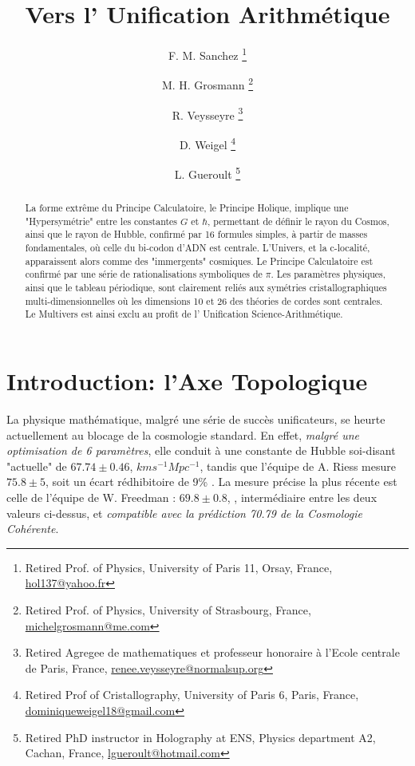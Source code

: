 \documentclass[a4paper,9pt]{article}
\title{Vers l' Unification Arithmétique}
\author{F. M. Sanchez \thanks{Retired Prof. of Physics, University of Paris 11, Orsay, France, \href{mailto:hol137@yahoo.fr}{hol137@yahoo.fr}} 
   \and M. H. Grosmann \thanks{Retired Prof. of Physics, University of Strasbourg, France, \href{mailto:michelgrosmann@me.com}{michelgrosmann@me.com}}
   \and R. Veysseyre \thanks{Retired Agregee de mathematiques et professeur honoraire \`a l'Ecole centrale de Paris, France, \href{mailto:renee.veysseyre@normalsup.org}{renee.veysseyre@normalsup.org}}
   \and D. Weigel  \thanks{Retired Prof of Cristallography, University of Paris 6, Paris, France, \href{mailto:dominiqueweigel18@gmail.com}{dominiqueweigel18@gmail.com}} 
   \and L. Gueroult \thanks{Retired PhD instructor in Holography at ENS, Physics department A2, Cachan, France, \href{mailto:lgueroult@hotmail.com}{lgueroult@hotmail.com}}
   }
\newcounter{row}
\begin{document}
\setcounter{page}{1}

\maketitle

\begin{abstract}


La forme extrême du Principe Calculatoire, le Principe Holique, implique une "Hypersymétrie" entre les constantes $G$ et $\hbar$, permettant de définir le rayon du Cosmos, ainsi que le rayon de Hubble, confirmé par 16 formules simples, à partir de masses fondamentales, où celle du bi-codon d'ADN est centrale. L'Univers, et la c-localité, apparaissent alors comme des "immergents" cosmiques. Le Principe Calculatoire est confirmé par une série de rationalisations symboliques de $\pi$. 
Les paramètres physiques, ainsi que le tableau périodique, sont clairement reliés aux symétries cristallographiques multi-dimensionnelles où les dimensions 10 et 26 des théories de cordes sont centrales.
Le Multivers est ainsi exclu au profit de l' Unification Science-Arithmétique. 


\end{abstract}






\tableofcontents
\listoftables{}   %
\listoffigures{}  %
\pagebreak

\section{Introduction: l'Axe Topologique}\label{AxeTopologique}

La physique mathématique, malgré une série de succès unificateurs, se heurte actuellement au blocage de la cosmologie standard. En effet, \textit{malgré une optimisation de 6 paramètres}, elle conduit à une constante de Hubble soi-disant "actuelle" de $67.74 \pm 0.46$, $km s^{-1}Mpc^{-1}$, tandis que l'équipe de A. Riess mesure $75.8 \pm 5$, soit un écart rédhibitoire de 9\% \cite{Riess}. La mesure précise la plus récente est celle de l'équipe de W. Freedman : $69.8 \pm 0.8$, \cite{Freedman}, intermédiaire entre les deux valeurs ci-dessus, et \textit{compatible avec la prédiction 70.79 de la Cosmologie Cohérente}\cite{Sanchez4}. 
\end{document}
